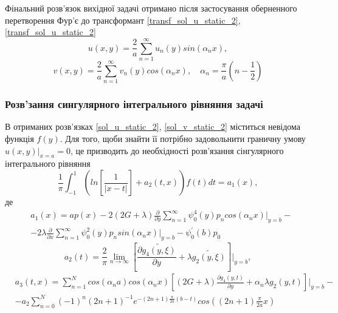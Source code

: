 Фінальний розв'язок вихідної задачі отримано після застосування оберненного перетворення Фур'є до трансформант \eqref{transf_sol_u_static_2}, \eqref{transf_sol_u_static_2}
\begin{equation}\label{sol_u_static_2}
    u(x,y) = \frac{2}{a} \sum_{n=1}^{\infty} u_n(y) sin(\alpha_n x),
\end{equation}
\begin{equation}\label{sol_v_static_2}
    v(x,y) = \frac{2}{a} \sum_{n=1}^{\infty} v_n(y) cos(\alpha_n x), \quad \alpha_n = \frac{\pi}{a}(n - \frac{1}{2})
\end{equation}

\subsubsection{Розв'зання сингулярного інтегрального рівняння задачі}
В отриманих розв'язках \eqref{sol_u_static_2}, \eqref{sol_v_static_2} міститься невідома функція $f(y)$.
Для того, щоби знайти її потрібно задовольнити граничну умову $u(x, y) |_{x=a} = 0$,
це призводить до необхідності розв'язання сінгулярного інтегрального рівняння
\begin{equation}\label{int_eq_static_2}
    \frac{1}{\pi} \int_{-1}^{1} \left( ln\left[ \frac{1}{\lvert x - t \rvert} \right] + a_2(t, x) \right) f(t) dt = a_1(x),
\end{equation}
де
\begin{align*}
    &a_1(x) = a p(x) - 2(2G + \lambda) \frac{\partial}{\partial y} \sum_{n=1}^{\infty} \psi_0^{4}(y) p_n cos(\alpha_n x)|_{y=b} - \nonumber \\
    &- 2\lambda \frac{\partial}{\partial x} \sum_{n=1}^{\infty}\psi_0^2(y) p_n sin(\alpha_n x)|_{y=b} - \psi_0^{'}(b) p_0
\end{align*}
\begin{equation*}
    a_2(t) = \frac{2}{\pi} \lim_{n \rightarrow \infty}\left[ \frac{\partial \widetilde{g_4(y, \xi)}}{\partial y} + \lambda \widetilde{g_2(y, \xi)} \right]|_{y=b}, 
\end{equation*}
\begin{align*}
    &a_3(t, x) = \sum_{n=1}^{N} cos(\alpha_n a) cos(\alpha_n x) \left[(2G + \lambda) \frac{\partial g_4(y, t)}{\partial y} + \alpha_n \lambda g_2(y, t) \right]|_{y=b} - \\
    & - a_2 \sum_{n=0}^{N} (-1)^n (2n + 1)^{-1} e^{-(2n + 1) \frac{\pi}{2a} (b - t)} cos((2n + 1) \frac{\pi}{2a} x)
\end{align*}

